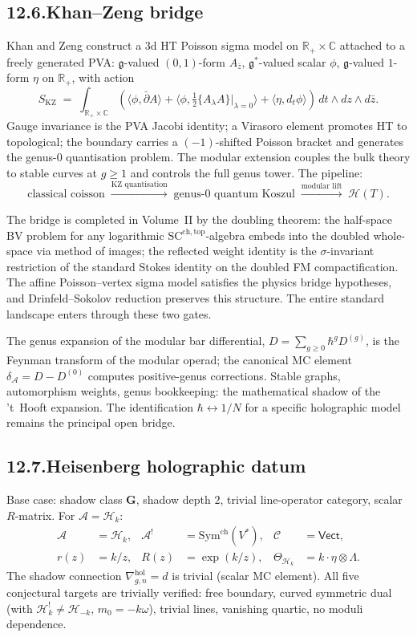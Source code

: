 \documentclass[11pt,reqno]{amsart}
\theoremstyle{definition}
\theoremstyle{remark}
\providecommand{\cA}{\mathcal{A}}
\providecommand{\cC}{\mathcal{C}}
\providecommand{\cH}{\mathcal{H}}
\providecommand{\Sym}{\mathrm{Sym}}
\providecommand{\fg}{\mathfrak{g}}
\providecommand{\hol}{\mathrm{hol}}
\providecommand{\bC}{\mathbb{C}}
\providecommand{\bR}{\mathbb{R}}
\providecommand{\SCchtop}{\mathrm{SC}^{\mathrm{ch,top}}}
\providecommand{\KZ}{\mathrm{KZ}}
\providecommand{\ch}{\mathrm{ch}}
\numberwithin{equation}{section}
\begin{document}
\subsection*{12.6.\enspace Khan--Zeng bridge}

Khan and Zeng construct a 3d HT Poisson sigma model on
$\bR_+ \times \bC$ attached to a freely generated PVA:
$\fg$-valued $(0,1)$-form $A_{\bar z}$, $\fg^*$-valued scalar
$\phi$, $\fg$-valued $1$-form $\eta$ on $\bR_+$, with action
\[
S_{\KZ}
\;=\;
\int_{\bR_+\times\bC}
(\langle\phi, \bar\partial A\rangle
+ \langle\phi, \tfrac12\{A_\lambda A\}|_{\lambda=0}\rangle
+ \langle\eta, d_t\phi\rangle)\,dt\wedge dz\wedge d\bar z.
\]
Gauge invariance is the PVA Jacobi identity; a Virasoro
element promotes HT to topological; the boundary carries a
$(-1)$-shifted Poisson bracket and generates the genus-$0$
quantisation problem. The modular extension couples the
bulk theory to stable curves at $g \ge 1$ and controls the
full genus tower. The pipeline:
\[
\text{classical coisson}
\;\xrightarrow{\text{KZ quantisation}}\;
\text{genus-$0$ quantum Koszul}
\;\xrightarrow{\text{modular lift}}\;
\cH(T).
\]

The bridge is completed in Volume~II by the doubling theorem:
the half-space BV problem for any logarithmic $\SCchtop$-algebra
embeds into the doubled whole-space via method of images; the
reflected weight identity is the $\sigma$-invariant restriction
of the standard Stokes identity on the doubled FM compactification.
The affine Poisson--vertex sigma model satisfies the physics
bridge hypotheses, and Drinfeld--Sokolov reduction preserves
this structure. The entire standard landscape enters through
these two gates.

The genus expansion of the modular bar differential,
$D = \sum_{g \ge 0} \hbar^g D^{(g)}$, is the Feynman transform
of the modular operad; the canonical MC element
$\delta_\cA = D - D^{(0)}$ computes positive-genus corrections.
Stable graphs, automorphism weights, genus bookkeeping: the
mathematical shadow of the 't~Hooft expansion. The
identification $\hbar \leftrightarrow 1/N$ for a specific
holographic model remains the principal open bridge.

\subsection*{12.7.\enspace Heisenberg holographic datum}

Base case: shadow class $\mathbf G$, shadow depth $2$, trivial
line-operator category, scalar $R$-matrix. For $\cA = \cH_k$:
\begin{align*}
\cA &= \cH_k, & \cA^! &= \Sym^{\ch}(V^*),
 & \cC &= \mathsf{Vect},\\
r(z) &= k/z, & R(z) &= \exp(k/z),
 & \Theta_{\cH_k} &= k\cdot\eta\otimes\Lambda.
\end{align*}
The shadow connection $\nabla^{\hol}_{g,n} = d$ is trivial
(scalar MC element). All five conjectural targets are
trivially verified: free boundary, curved symmetric dual
(with $\cH_k^! \neq \cH_{-k}$, $m_0 = -k\omega$), trivial
lines, vanishing quartic, no moduli dependence.
\end{document}
